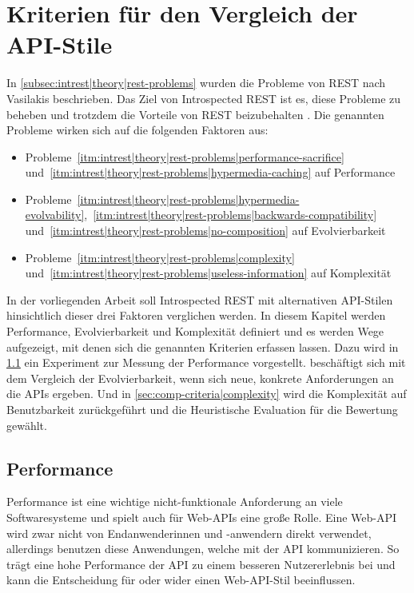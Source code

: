 \chapter{Kriterien für den Vergleich der API-Stile}\label{ch:comp-criteria}

In \cref{subsec:intrest|theory|rest-problems} wurden die Probleme von REST nach Vasilakis beschrieben. Das Ziel von Introspected REST ist es, diese Probleme zu beheben und trotzdem die Vorteile von REST beizubehalten \autocite[Kap.~2]{Vasilakis2017}. Die genannten Probleme wirken sich auf die folgenden Faktoren aus:

\begin{itemize}[noitemsep]
    \item Probleme~\ref{itm:intrest|theory|rest-problems|performance-sacrifice} und~\ref{itm:intrest|theory|rest-problems|hypermedia-caching} auf Performance
    \item Probleme~\ref{itm:intrest|theory|rest-problems|hypermedia-evolvability},~\ref{itm:intrest|theory|rest-problems|backwards-compatibility} und~\ref{itm:intrest|theory|rest-problems|no-composition} auf Evolvierbarkeit
    \item Probleme~\ref{itm:intrest|theory|rest-problems|complexity} und~\ref{itm:intrest|theory|rest-problems|useless-information} auf Komplexität
\end{itemize}
In der vorliegenden Arbeit soll Introspected REST mit alternativen API-Stilen hinsichtlich dieser drei Faktoren verglichen werden. In diesem Kapitel werden Performance, Evolvierbarkeit und Komplexität definiert und es werden Wege aufgezeigt, mit denen sich die genannten Kriterien erfassen lassen. Dazu wird in \cref{sec:comp-criteria|performance} ein Experiment zur Messung der Performance vorgestellt.  beschäftigt sich mit dem Vergleich der Evolvierbarkeit, wenn sich neue, konkrete Anforderungen an die APIs ergeben. Und in \cref{sec:comp-criteria|complexity} wird die Komplexität auf Benutzbarkeit zurückgeführt und die Heuristische Evaluation für die Bewertung gewählt.

\section{Performance}\label{sec:comp-criteria|performance}

Performance ist eine wichtige nicht-funktionale Anforderung an viele Softwaresysteme \autocites{Williams1998}{Loosley1998} und spielt auch für Web-APIs eine große Rolle. Eine Web-API wird zwar nicht von Endanwenderinnen und -anwendern direkt verwendet, allerdings benutzen diese Anwendungen, welche mit der API kommunizieren. So trägt eine hohe Performance der API zu einem besseren Nutzererlebnis bei und kann die Entscheidung für oder wider einen Web-API-Stil beeinflussen.

